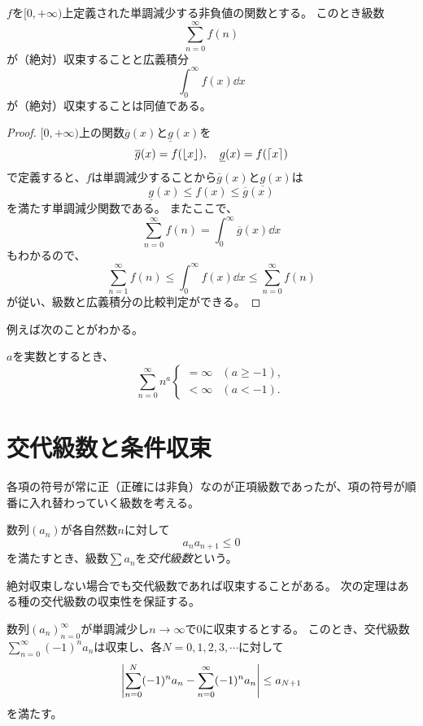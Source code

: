 \begin{theorem}[級数と広義積分の比較]
$f$を$[0, +\infty)$上定義された単調減少する非負値の関数とする。
このとき級数
$$
\sum_{n = 0}^\infty f(n)
$$
が（絶対）収束することと広義積分
$$
\int_0^\infty f(x)\dd{x}
$$
が（絶対）収束することは同値である。
\end{theorem}

\begin{proof}
$[0, +\infty)$上の関数$\overline{g}(x)$と$\underline{g}(x)$を
$$
\overline{g}(x) = f(\lfloor x\rfloor),
\quad \underline{g}(x) = f(\lceil x\rceil)
$$
で定義すると、$f$は単調減少することから$\overline{g}(x)$と$\underline{g}(x)$は
$$
\underline{g}(x) \le f(x) \le \overline{g}(x)
$$
を満たす単調減少関数である。
またここで、
$$
\sum_{n = 0}^\infty f(n) = \int_0^\infty \overline{g}(x)\dd{x}
$$
もわかるので、
$$
\sum_{n = 1}^\infty f(n) \le \int_0^\infty f(x)\dd{x} \le \sum_{n = 0}^\infty f(n)
$$
が従い、級数と広義積分の比較判定ができる。
\end{proof}

例えば次のことがわかる。

\begin{proposition}
$a$を実数とするとき、
$$
\sum_{n = 0}^\infty n^a
\begin{cases}
= \infty & (a \ge -1), \\
< \infty & (a < -1).
\end{cases}
$$
\end{proposition}

\section{交代級数と条件収束}

各項の符号が常に正（正確には非負）なのが正項級数であったが、項の符号が順番に入れ替わっていく級数を考える。

\begin{definition}[交代級数]
数列$(a_n)$が各自然数$n$に対して
$$
a_n a_{n+1} \le 0
$$
を満たすとき、級数$\sum a_n$を\emph{交代級数}という。
\end{definition}

絶対収束しない場合でも交代級数であれば収束することがある。
次の定理はある種の交代級数の収束性を保証する。

\begin{theorem}[ライプニッツの判定法]
数列$(a_n)_{n = 0}^\infty$が単調減少し$n \to \infty$で$0$に収束するとする。
このとき、交代級数$\sum_{n = 0}^\infty (-1)^n a_n$は収束し、各$N = 0, 1, 2, 3, \cdots$に対して
$$
\abs{\sum_{n = 0}^N (-1)^n a_n-\sum_{n = 0}^\infty (-1)^n a_n} \le a_{N+1}
$$
を満たす。
\end{theorem}

